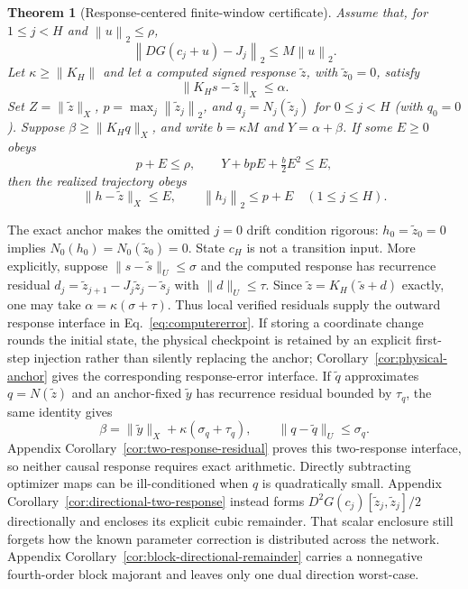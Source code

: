 \documentclass{article}
\newtheorem{theorem}{Theorem}
\newcommand{\norm}[1]{\left\lVert #1\right\rVert_2}
\begin{document}
\begin{theorem}[Response-centered finite-window certificate]
\label{thm:green}
Assume that, for $1\le j<H$ and $\norm{u}\le\rho$,
\begin{equation}
 \norm{DG(c_j+u)-J_j}\le M\norm{u}.
 \label{eq:drift}
\end{equation}
Let $\kappa\ge\lVert K_H\rVert$ and let a computed signed response
$\widetilde z$, with $\widetilde z_0=0$, satisfy
\begin{equation}
 \lVert K_Hs-\widetilde z\rVert_X\le\alpha.
 \label{eq:computererror}
\end{equation}
Set $Z=\lVert\widetilde z\rVert_X$,
$p=\max_j\norm{\widetilde z_j}$, and
$q_j=N_j(\widetilde z_j)$ for $0\le j<H$ (with $q_0=0$).  Suppose
$\beta\ge\lVert K_Hq\rVert_X$, and write $b=\kappa M$ and
$Y=\alpha+\beta$.  If some $E\ge0$ obeys
\begin{equation}
 p+E\le\rho,
 \qquad
 Y+bpE+\tfrac b2E^2\le E,
 \label{eq:closure}
\end{equation}
then the realized trajectory obeys
\begin{equation}
 \lVert h-\widetilde z\rVert_X\le E,
 \qquad \norm{h_j}\le p+E\quad(1\le j\le H).
 \label{eq:response-tube}
\end{equation}
\end{theorem}

The exact anchor makes the omitted $j=0$ drift condition rigorous:
$h_0=\widetilde z_0=0$ implies $N_0(h_0)=N_0(\widetilde z_0)=0$.  State
$c_H$ is not a transition input.  More explicitly, suppose
$\|s-\widetilde s\|_U\le\sigma$ and the computed response has recurrence
residual $d_j=\widetilde z_{j+1}-J_j\widetilde z_j-\widetilde s_j$ with
$\|d\|_U\le\tau$.  Since $\widetilde z=K_H(\widetilde s+d)$ exactly, one may
take $\alpha=\kappa(\sigma+\tau)$.  Thus local verified residuals supply the
outward response interface in Eq.~\eqref{eq:computererror}.
If storing a coordinate change rounds the initial state, the physical
checkpoint is retained by an explicit first-step injection rather than
silently replacing the anchor; Corollary~\ref{cor:physical-anchor} gives the
corresponding response-error interface.
If $\widetilde q$ approximates $q=N(\widetilde z)$ and an anchor-fixed
$\widetilde y$ has recurrence residual bounded by $\tau_q$, the same identity
gives
\begin{equation}
 \beta=\|\widetilde y\|_X+\kappa(\sigma_q+\tau_q),
 \qquad \|q-\widetilde q\|_U\le\sigma_q.
 \label{eq:main-two-response}
\end{equation}
Appendix Corollary~\ref{cor:two-response-residual} proves this two-response
interface, so neither causal response requires exact arithmetic.  Directly
subtracting optimizer maps can be ill-conditioned when $q$ is quadratically
small.  Appendix Corollary~\ref{cor:directional-two-response} instead forms
$D^2G(c_j)[\widetilde z_j,\widetilde z_j]/2$ directionally and encloses its
explicit cubic remainder.  That scalar enclosure still forgets how the known
parameter correction is distributed across the network.  Appendix
Corollary~\ref{cor:block-directional-remainder} carries a nonnegative
fourth-order block majorant and leaves only one dual direction worst-case.
\end{document}
